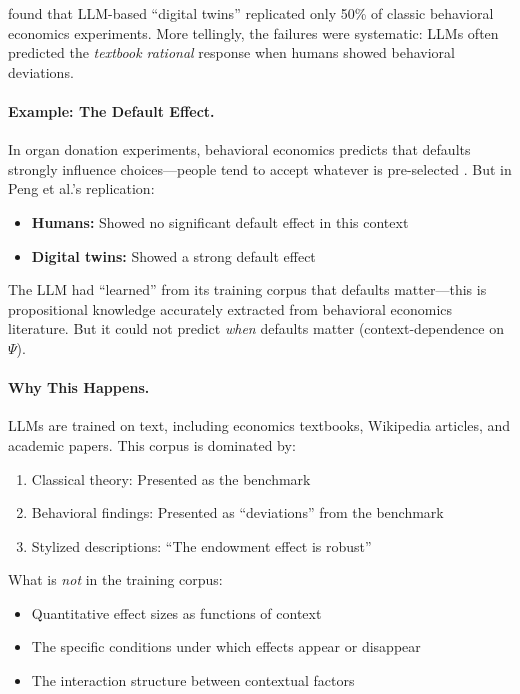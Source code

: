 \citet{peng2025} found that LLM-based ``digital twins'' replicated only 50\% of
classic behavioral economics experiments. More tellingly, the failures were
systematic: LLMs often predicted the \emph{textbook rational} response when
humans showed behavioral deviations.

\paragraph{Example: The Default Effect.}
In organ donation experiments, behavioral economics predicts that defaults
strongly influence choices---people tend to accept whatever is pre-selected
\citep{johnson2003}. But in Peng et al.'s replication:
\begin{itemize}
    \item \textbf{Humans:} Showed no significant default effect in this context
    \item \textbf{Digital twins:} Showed a strong default effect
\end{itemize}

The LLM had ``learned'' from its training corpus that defaults matter---this is
propositional knowledge accurately extracted from behavioral economics literature.
But it could not predict \emph{when} defaults matter (context-dependence on $\Psi$).

\paragraph{Why This Happens.}
LLMs are trained on text, including economics textbooks, Wikipedia articles, and
academic papers. This corpus is dominated by:
\begin{enumerate}
    \item Classical theory: Presented as the benchmark
    \item Behavioral findings: Presented as ``deviations'' from the benchmark
    \item Stylized descriptions: ``The endowment effect is robust''
\end{enumerate}

What is \emph{not} in the training corpus:
\begin{itemize}
    \item Quantitative effect sizes as functions of context
    \item The specific conditions under which effects appear or disappear
    \item The interaction structure between contextual factors
\end{itemize}

